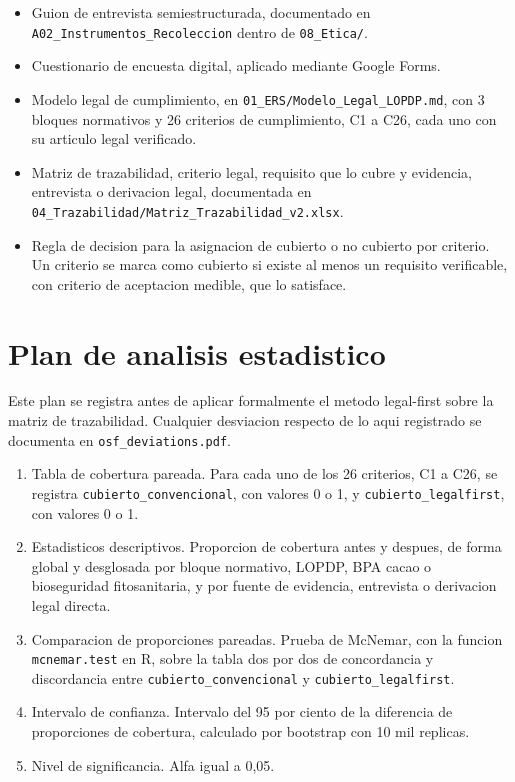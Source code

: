 \documentclass[11pt,a4paper]{article}
\begin{document}
\begin{itemize}
\item Guion de entrevista semiestructurada, documentado en \texttt{A02\_Instrumentos\_Recoleccion} dentro de \texttt{08\_Etica/}.
\item Cuestionario de encuesta digital, aplicado mediante Google Forms.
\item Modelo legal de cumplimiento, en \texttt{01\_ERS/Modelo\_Legal\_LOPDP.md}, con 3 bloques normativos y 26 criterios de cumplimiento, C1 a C26, cada uno con su articulo legal verificado.
\item Matriz de trazabilidad, criterio legal, requisito que lo cubre y evidencia, entrevista o derivacion legal, documentada en \texttt{04\_Trazabilidad/Matriz\_Trazabilidad\_v2.xlsx}.
\item Regla de decision para la asignacion de cubierto o no cubierto por criterio. Un criterio se marca como cubierto si existe al menos un requisito verificable, con criterio de aceptacion medible, que lo satisface.
\end{itemize}

\section{Plan de analisis estadistico}

Este plan se registra antes de aplicar formalmente el metodo legal-first sobre la matriz de trazabilidad. Cualquier desviacion respecto de lo aqui registrado se documenta en \texttt{osf\_deviations.pdf}.

\begin{enumerate}
\item Tabla de cobertura pareada. Para cada uno de los 26 criterios, C1 a C26, se registra \texttt{cubierto\_convencional}, con valores 0 o 1, y \texttt{cubierto\_legalfirst}, con valores 0 o 1.
\item Estadisticos descriptivos. Proporcion de cobertura antes y despues, de forma global y desglosada por bloque normativo, LOPDP, BPA cacao o bioseguridad fitosanitaria, y por fuente de evidencia, entrevista o derivacion legal directa.
\item Comparacion de proporciones pareadas. Prueba de McNemar, con la funcion \texttt{mcnemar.test} en R, sobre la tabla dos por dos de concordancia y discordancia entre \texttt{cubierto\_convencional} y \texttt{cubierto\_legalfirst}.
\item Intervalo de confianza. Intervalo del 95 por ciento de la diferencia de proporciones de cobertura, calculado por bootstrap con 10 mil replicas.
\item Nivel de significancia. Alfa igual a 0,05.
\end{enumerate}
\end{document}
